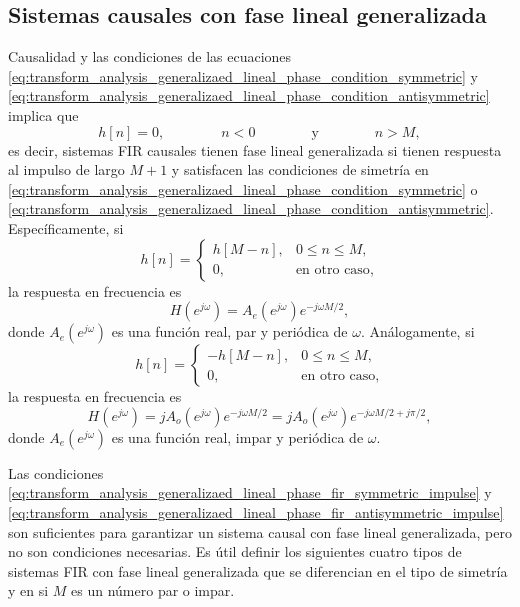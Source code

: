 \documentclass[a4paper]{report}
\begin{document}
\subsection{Sistemas causales con fase lineal generalizada}

Causalidad y las condiciones de las ecuaciones \ref{eq:transform_analysis_generalizaed_lineal_phase_condition_symmetric} y \ref{eq:transform_analysis_generalizaed_lineal_phase_condition_antisymmetric} implica que 
\[
 h[n]=0,
 \qquad\qquad 
 n<0
 \qquad\qquad\textrm{y}\qquad\qquad
 n>M,
\]
es decir, sistemas FIR causales tienen fase lineal generalizada si tienen respuesta al impulso de largo \(M+1\) y satisfacen las condiciones de simetría en \ref{eq:transform_analysis_generalizaed_lineal_phase_condition_symmetric} o \ref{eq:transform_analysis_generalizaed_lineal_phase_condition_antisymmetric}. Específicamente, si
\begin{equation}\label{eq:transform_analysis_generalizaed_lineal_phase_fir_symmetric_impulse}
 h[n]=
 \left\{
 \begin{array}{ll}
  h[M-n],&0\leq n\leq M,\\
  0,&\textrm{en otro caso},
 \end{array}
 \right. 
\end{equation}
la respuesta en frecuencia es
\begin{equation}\label{eq:transform_analysis_generalizaed_lineal_phase_fir_symmetric_freq}
 H(e^{j\omega})=A_e(e^{j\omega})e^{-j\omega M/2}, 
\end{equation}
donde \(A_e(e^{j\omega})\) es una función real, par y periódica de \(\omega\). Análogamente, si
\begin{equation}\label{eq:transform_analysis_generalizaed_lineal_phase_fir_antisymmetric_impulse}
 h[n]=
 \left\{
 \begin{array}{ll}
  -h[M-n],&0\leq n\leq M,\\
  0,&\textrm{en otro caso},
 \end{array}
 \right. 
\end{equation}
la respuesta en frecuencia es
\begin{equation}\label{eq:transform_analysis_generalizaed_lineal_phase_fir_antisymmetric_freq}
 H(e^{j\omega})=jA_o(e^{j\omega})e^{-j\omega M/2}=jA_o(e^{j\omega})e^{-j\omega M/2+j\pi/2}, 
\end{equation}
donde \(A_e(e^{j\omega})\) es una función real, impar y periódica de \(\omega\).

Las condiciones \ref{eq:transform_analysis_generalizaed_lineal_phase_fir_symmetric_impulse} y \ref{eq:transform_analysis_generalizaed_lineal_phase_fir_antisymmetric_impulse} son suficientes para garantizar un sistema causal con fase lineal generalizada, pero no son condiciones necesarias. Es útil definir los siguientes cuatro tipos de sistemas FIR con fase lineal generalizada que se diferencian en el tipo de simetría y en si \(M\) es un número par o impar.
\end{document}
